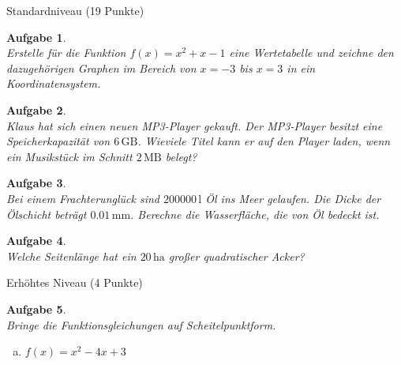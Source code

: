 \documentclass[11pt,fleqn]{article}
\theoremstyle{aufg}
\newtheorem{aufgabe}{Aufgabe}
\theoremstyle{bsp}
\begin{document}
\begin{flushleft}
\begin{center} \begin{framed} Standardniveau (19 Punkte) \end{framed} \end{center}\begin{aufgabe} ~ \\ 
Erstelle f\"ur die Funktion $f(x)=x^{2} + x - 1$ eine Wertetabelle und zeichne den dazugeh\"origen Graphen im Bereich von $x=-3$ bis $x=3$ in ein Koordinatensystem. \\ 
\end{aufgabe} 
\begin{aufgabe} ~ \\ 
Klaus hat sich einen neuen MP3-Player gekauft. Der MP3-Player besitzt eine Speicherkapazit\"at von $6\mathrm{\,GB}$. Wieviele Titel kann er auf den Player laden, wenn ein Musikst\"uck im Schnitt $2\mathrm{\,MB}$ belegt? 
\end{aufgabe} 
\begin{aufgabe} ~ \\ 
Bei einem Frachterungl\"uck sind $200000\mathrm{\,l}$ \"Ol ins Meer gelaufen. Die Dicke der \"Olschicht betr\"agt $0.01\mathrm{\,mm}$. Berechne die Wasserfl\"ache, die von \"Ol bedeckt ist.
\end{aufgabe} 
\begin{aufgabe} ~ \\ 
Welche Seitenl\"ange hat ein $20\mathrm{\,ha}$ gro\ss{}er quadratischer Acker?
\end{aufgabe} 
\begin{center} \begin{framed} Erh\"ohtes Niveau (4 Punkte) \end{framed} \end{center}\begin{aufgabe} ~ \\ 
Bringe die Funktionsgleichungen auf Scheitelpunktform. \\ 
\begin{multicols}{3} 
\begin{enumerate}[a)] 
\item 
$f(x)=x^{2} - 4 x + 3$
\end{enumerate} 
\end{multicols} 
\end{aufgabe} 
\end{flushleft} 
    
\end{document}
